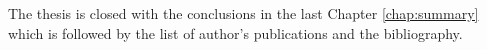 % 
% 

The thesis is closed with the conclusions in the last Chapter \ref{chap:summary}
which is followed by the list of author's publications and the bibliography.













